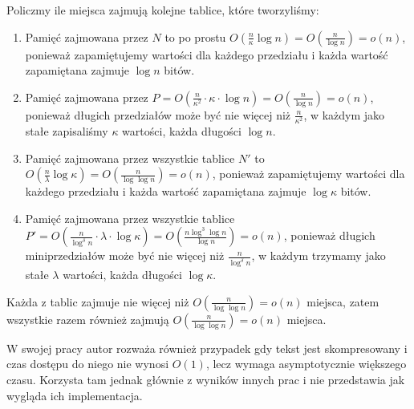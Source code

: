 \documentclass{article}
\begin{document}
Policzmy ile miejsca zajmują kolejne tablice, które tworzyliśmy:
\begin{enumerate}
    \item Pamięć zajmowana przez $N$ to po prostu $O(\frac{n}{\kappa}\log{n}) = O(\frac{n}{\log{n}}) = o(n)$, ponieważ zapamiętujemy wartości dla każdego przedziału i każda wartość zapamiętana zajmuje $\log{n}$ bitów.
    \item Pamięć zajmowana przez $P = O(\frac{n}{\kappa^2} \cdot \kappa \cdot \log{n}) = O(\frac{n}{\log{n}}) = o(n)$, ponieważ długich przedziałów może być nie więcej niż $\frac{n}{\kappa^2}$, w każdym jako stałe zapisaliśmy $\kappa$ wartości, każda długości $\log{n}$.
    \item Pamięć zajmowana przez wszystkie tablice $N'$ to $O(\frac{n}{\lambda}\log{\kappa}) = O(\frac{n}{\log{\log{n}}}) = o(n)$, ponieważ zapamiętujemy wartości dla każdego przedziału i każda wartość zapamiętana zajmuje $\log{\kappa}$ bitów.
    \item Pamięć zajmowana przez wszystkie tablice $P' = O(\frac{n}{\log^{\delta}{n}} \cdot \lambda \cdot \log{\kappa}) = O(\frac{n \log^3{\log{n}}}{\log{n}}) = o(n)$, ponieważ długich miniprzedziałów może być nie więcej niż $\frac{n}{\log^{\delta}{n}}$, w każdym trzymamy jako stałe $\lambda$ wartości, każda długości $\log{\kappa}$.
\end{enumerate}

Każda z tablic zajmuje nie więcej niż $O(\frac{n}{\log{\log{n}}}) = o(n)$ miejsca, zatem wszystkie razem również zajmują $O(\frac{n}{\log{\log{n}}}) = o(n)$ miejsca.

W swojej pracy autor rozważa również przypadek gdy tekst jest skompresowany i czas dostępu do niego nie wynosi $O(1)$, lecz wymaga asymptotycznie większego czasu. Korzysta tam jednak głównie z wyników innych prac i nie przedstawia jak wygląda ich implementacja.
\end{document}
